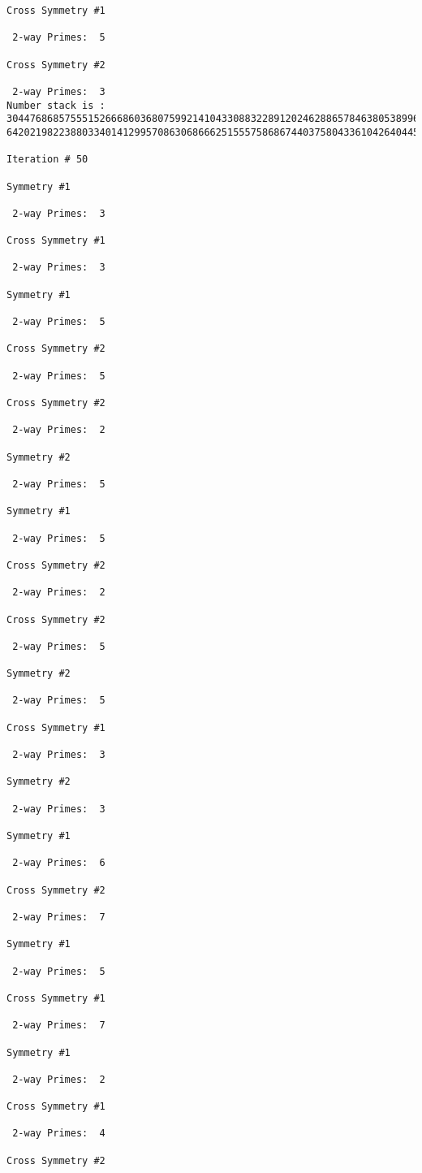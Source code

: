 {{{{\begin{verbatim}
Cross Symmetry #1

 2-way Primes: 	5

Cross Symmetry #2

 2-way Primes: 	3
Number stack is :
30447686857555152666860368075992141043308832289120246288657846380538996794608835958544046240163340857
64202198223880334014129957086306866625155575868674403758043361042640445859538806497699835083648756882

Iteration #	50

Symmetry #1

 2-way Primes: 	3

Cross Symmetry #1

 2-way Primes: 	3

Symmetry #1

 2-way Primes: 	5

Cross Symmetry #2

 2-way Primes: 	5

Cross Symmetry #2

 2-way Primes: 	2

Symmetry #2

 2-way Primes: 	5

Symmetry #1

 2-way Primes: 	5

Cross Symmetry #2

 2-way Primes: 	2

Cross Symmetry #2

 2-way Primes: 	5

Symmetry #2

 2-way Primes: 	5

Cross Symmetry #1

 2-way Primes: 	3

Symmetry #2

 2-way Primes: 	3

Symmetry #1

 2-way Primes: 	6

Cross Symmetry #2

 2-way Primes: 	7

Symmetry #1

 2-way Primes: 	5

Cross Symmetry #1

 2-way Primes: 	7

Symmetry #1

 2-way Primes: 	2

Cross Symmetry #1

 2-way Primes: 	4

Cross Symmetry #2


\end{verbatim}}}}}
